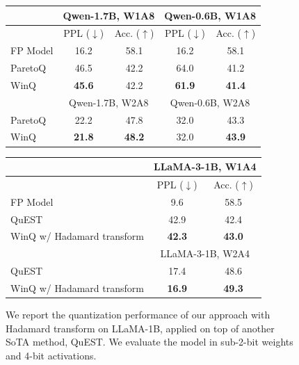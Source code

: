 \documentclass{article}
\theoremstyle{definition}
\newcommand{\acronym}{{\sc WinQ}}
\begin{document}
\begin{figure}[t]
  \centering
  \begin{minipage}[t]{0.485\textwidth}
    \centering
    \captionsetup{type=table}
    \caption{We report the quantization performance of applying our approach to Qwen models, as compared to the SoTA method, ParetoQ. We evaluated the models in sub-2-bit weights and 8-bit activations. }\label{tab_qwen}
    \resizebox{0.85\textwidth}{!}
    {\begin{tabular}{lcc|cc}
    \toprule 
     & \multicolumn{2}{c|}{Qwen-1.7B, W1A8} &  \multicolumn{2}{c}{Qwen-0.6B, W1A8} \\ \midrule
     & PPL ($\downarrow$) & Acc. ($\uparrow$) & PPL ($\downarrow$) & Acc. ($\uparrow$)\\ \midrule
    FP Model & 16.2 & 58.1 & 16.2 & 58.1  \\ \midrule
    ParetoQ &   46.5 & 42.2  & 64.0 & 41.2\\ 
    \acronym{} & \textbf{45.6} & {42.2} & \textbf{61.9} & \textbf{41.4}   \\ \midrule      & \multicolumn{2}{c|}{Qwen-1.7B, W2A8} &  \multicolumn{2}{c}{Qwen-0.6B, W2A8} \\ \midrule 
    ParetoQ & 22.2 &  47.8  & 32.0 & 43.3 \\ 
    \acronym{} & \textbf{21.8}  & \textbf{48.2} & 32.0 & \textbf{43.9} \\
    \bottomrule
      \end{tabular}}
  \end{minipage}\hfill
  \begin{minipage}[t]{0.485\textwidth}
    \centering
    \captionsetup{type=table}
    \caption{We report the quantization performance of our approach with Hadamard transform on LLaMA-1B, applied on top of another SoTA method, QuEST. We evaluate the model in sub-2-bit weights and 4-bit activations. }\label{tab_quest}
    \resizebox{0.89\textwidth}{!}
    {\begin{tabular}{lcc}
    \toprule 
     & \multicolumn{2}{c}{LLaMA-3-1B, W1A4} \\ \midrule
    & PPL ($\downarrow$) & Acc. ($\uparrow$)     \\ \midrule
    FP Model & {9.6} & 58.5 \\ \midrule
    QuEST  &   42.9 & 42.4  \\  
    \acronym{} w/ Hadamard transform& \textbf{42.3}  & \textbf{43.0}  \\ \midrule
    & \multicolumn{2}{c}{LLaMA-3-1B, W2A4} \\ \midrule
    QuEST  & 17.4 &  48.6   \\ 
    \acronym{} w/ Hadamard transform & \textbf{16.9} & \textbf{49.3}   \\
    \bottomrule
      \end{tabular}
      }
  \end{minipage}
\end{figure}
\end{document}
